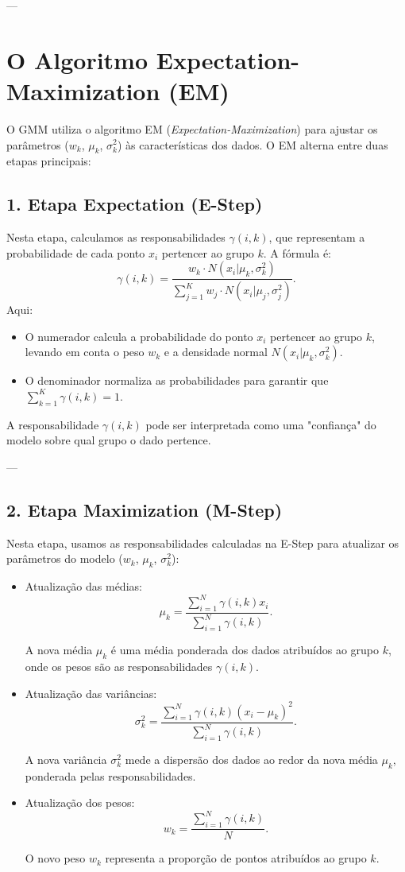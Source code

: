 \documentclass[a4paper,12pt]{article}
\begin{document}
---

\section*{O Algoritmo Expectation-Maximization (EM)}

O GMM utiliza o algoritmo EM (\textit{Expectation-Maximization}) para ajustar os parâmetros ($w_k$, $\mu_k$, $\sigma_k^2$) às características dos dados. O EM alterna entre duas etapas principais:

\subsection*{1. Etapa Expectation (E-Step)}
Nesta etapa, calculamos as responsabilidades $\gamma(i,k)$, que representam a probabilidade de cada ponto $x_i$ pertencer ao grupo $k$. A fórmula é:
\[
\gamma(i,k) = 
\frac{
w_k \cdot N(x_i | \mu_k, \sigma_k^2)
}{
\sum_{j=1}^K w_j \cdot N(x_i | \mu_j, \sigma_j^2)
}.
\]
Aqui:
\begin{itemize}
    \item O numerador calcula a probabilidade do ponto $x_i$ pertencer ao grupo $k$, levando em conta o peso $w_k$ e a densidade normal $N(x_i | \mu_k, \sigma_k^2)$.
    \item O denominador normaliza as probabilidades para garantir que $\sum_{k=1}^K \gamma(i,k) = 1$.
\end{itemize}

A responsabilidade $\gamma(i,k)$ pode ser interpretada como uma "confiança" do modelo sobre qual grupo o dado pertence.

---

\subsection*{2. Etapa Maximization (M-Step)}
Nesta etapa, usamos as responsabilidades calculadas na E-Step para atualizar os parâmetros do modelo ($w_k$, $\mu_k$, $\sigma_k^2$):
\begin{itemize}
    \item Atualização das médias:
    \[
    \mu_k = 
    \frac{\sum_{i=1}^N \gamma(i,k) x_i}{\sum_{i=1}^N \gamma(i,k)}.
    \]
    
    A nova média $\mu_k$ é uma média ponderada dos dados atribuídos ao grupo $k$, onde os pesos são as responsabilidades $\gamma(i,k)$.

    \item Atualização das variâncias:
    \[
    \sigma_k^2 = 
    \frac{\sum_{i=1}^N \gamma(i,k) (x_i - \mu_k)^2}{\sum_{i=1}^N \gamma(i,k)}.
    \]
    
    A nova variância $\sigma_k^2$ mede a dispersão dos dados ao redor da nova média $\mu_k$, ponderada pelas responsabilidades.

    \item Atualização dos pesos:
    \[
    w_k = 
    \frac{\sum_{i=1}^N \gamma(i,k)}{N}.
    \]
    
    O novo peso $w_k$ representa a proporção de pontos atribuídos ao grupo $k$.
\end{itemize}
\end{document}
